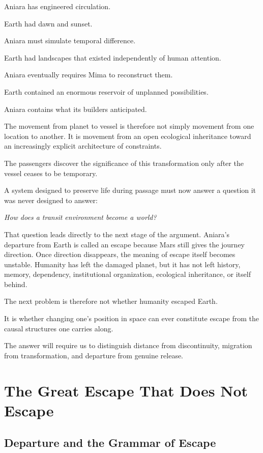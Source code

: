 \documentclass[11pt,oneside]{book}
\theoremstyle{definition}
\theoremstyle{remark}
\begin{document}
Aniara has engineered circulation.

Earth had dawn and sunset.

Aniara must simulate temporal difference.

Earth had landscapes that existed independently of human attention.

Aniara eventually requires Mima to reconstruct them.

Earth contained an enormous reservoir of unplanned possibilities.

Aniara contains what its builders anticipated.

The movement from planet to vessel is therefore not simply movement from one location to another. It is movement from an open ecological inheritance toward an increasingly explicit architecture of constraints.

The passengers discover the significance of this transformation only after the vessel ceases to be temporary.

A system designed to preserve life during passage must now answer a question it was never designed to answer:

\begin{center}
\emph{How does a transit environment become a world?}
\end{center}

That question leads directly to the next stage of the argument. Aniara's departure from Earth is called an escape because Mars still gives the journey direction. Once direction disappears, the meaning of escape itself becomes unstable. Humanity has left the damaged planet, but it has not left history, memory, dependency, institutional organization, ecological inheritance, or itself behind.

The next problem is therefore not whether humanity escaped Earth.

It is whether changing one's position in space can ever constitute escape from the causal structures one carries along.

The answer will require us to distinguish distance from discontinuity, migration from transformation, and departure from genuine release.

\chapter{The Great Escape That Does Not Escape}

\section{Departure and the Grammar of Escape}
\end{document}
